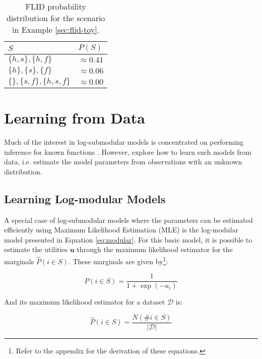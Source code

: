 \begin{table}
  \centering
  \caption{FLID probability distribution for the scenario in Example \ref{sec:flid-toy}.}
  \begin{tabular}{@{}ll@{}}
    \toprule
    $S$ & $P(S)$  \\
    \midrule
    $\{h,s\}, \{h,f\}$ & $\approx 0.41$ \\
    $\{h\}, \{s\}, \{f\}$ & $\approx 0.06$ \\
    $\{\}, \{s,f\}, \{h,s,f\}$ & $\approx 0.00$ \\
    \bottomrule
  \end{tabular}
  \label{tab:flid-toy-probs}
\end{table}

\section{Learning from Data}
\label{sec:learning}

Much of the interest in log-submodular models is concentrated on performing inference for known functions \citep{tschiatschek16learning}. However, \citet{tschiatschek16learning} explore how to learn such models from data, i.e. estimate the model parameters from observations with an unknown distribution.

\subsection{Learning Log-modular Models}

A special case of log-submodular models where the parameters can be estimated efficiently using Maximum Likelihood Estimation (MLE) is the log-modular model presented in Equation \eqref{eq:modular}. For this basic model, it is possible to estimate the utilities $\mathbf{u}$ through the maximum likelihood estimator for the marginals $\hat{P}(i \in S)$. These marginals are given by\footnote{Refer to the appendix for the derivation of these equations.}:

\begin{equation}
P(i \in S) = \frac{1}{1 + \exp(-u_{i})}
\end{equation}

And its maximum likelihood estimator for a dataset $\mathcal{D}$ is:

\begin{equation}
\hat{P}(i \in S) = \frac{N(\#i \in S)}{|\mathcal{D}|}
\end{equation}

